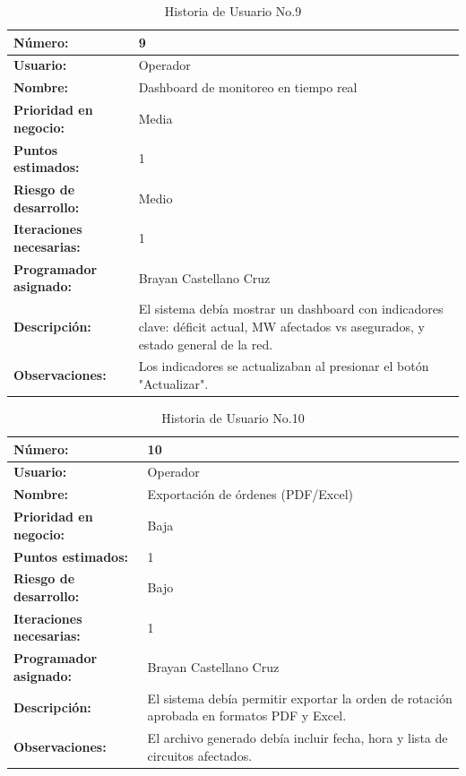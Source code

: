 \begin{table}[H]
\centering
\caption{Historia de Usuario No.9}
\label{tab:hu_09}
\footnotesize
\begin{tabular}{|p{3cm}|p{9cm}|}
\hline
\textbf{Número:} & 9 \\
\hline
\textbf{Usuario:} & Operador \\
\hline
\textbf{Nombre:} & Dashboard de monitoreo en tiempo real \\
\hline
\textbf{Prioridad en negocio:} & Media \\
\hline
\textbf{Puntos estimados:} & 1 \\
\hline
\textbf{Riesgo de desarrollo:} & Medio \\
\hline
\textbf{Iteraciones necesarias:} & 1 \\
\hline
\textbf{Programador asignado:} & Brayan Castellano Cruz \\
\hline
\textbf{Descripción:} & El sistema debía mostrar un dashboard con indicadores clave: déficit actual, MW afectados vs asegurados, y estado general de la red. \\
\hline
\textbf{Observaciones:} & Los indicadores se actualizaban al presionar el botón "Actualizar". \\
\hline
\end{tabular}
\end{table}

\begin{table}[H]
\centering
\caption{Historia de Usuario No.10}
\label{tab:hu_10}
\footnotesize
\begin{tabular}{|p{3cm}|p{9cm}|}
\hline
\textbf{Número:} & 10 \\
\hline
\textbf{Usuario:} & Operador \\
\hline
\textbf{Nombre:} & Exportación de órdenes (PDF/Excel) \\
\hline
\textbf{Prioridad en negocio:} & Baja \\
\hline
\textbf{Puntos estimados:} & 1 \\
\hline
\textbf{Riesgo de desarrollo:} & Bajo \\
\hline
\textbf{Iteraciones necesarias:} & 1 \\
\hline
\textbf{Programador asignado:} & Brayan Castellano Cruz \\
\hline
\textbf{Descripción:} & El sistema debía permitir exportar la orden de rotación aprobada en formatos PDF y Excel. \\
\hline
\textbf{Observaciones:} & El archivo generado debía incluir fecha, hora y lista de circuitos afectados. \\
\hline
\end{tabular}
\end{table}

